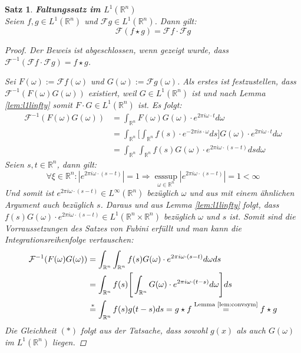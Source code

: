\documentclass{article}
\newcommand{\R}[0]{\mathbb{R}}
\newcommand{\F}[0]{\mathcal{F}}
\theoremstyle{plain}
\newtheorem{thm}{Satz}[section]
\theoremstyle{definition}
\DeclareMathOperator{\esssup}{esssup}
\begin{document}
\begin{thm}\label{thm:convinvl1}
    \textbf{Faltungssatz im $L^1(\R^n)$} \\
    Seien $f,g \in L^1(\R^n)$ und $\mathcal{F}g \in L^1(\R^n)$. Dann gilt:
    \begin{equation}
        \mathcal{F}(f \star g) = \mathcal{F}f \cdot \mathcal{F}g
    \end{equation}

    \begin{proof} \cite[S. 371f.]{howell2016principles}
        Der Beweis ist abgeschlossen, wenn gezeigt wurde, dass $\F^{-1} (\F f \cdot \F g) = f \star g$. 
        
        Sei $F(\omega) := \F f(\omega)$ und $G(\omega) := \F g(\omega)$. Als erstes ist festzustellen, dass $\F^{-1} (F(\omega) G(\omega))$ existiert, weil
        $G \in L^1(\R^n)$ ist und nach Lemma \ref{lem:l1linfty} somit $F \cdot G \in L^1(\R^n)$ ist. Es folgt: \\
        \begin{align*}
            \F^{-1} (F(\omega) G(\omega)) &= \int_{\R^n} F(\omega) G(\omega) \cdot e^{2\pi i \omega \cdot t} d\omega \\
            &= \int_{\R^n} \Bigg\lbrack \int_{\R^n} f(s) \cdot e^{-2\pi i s \cdot \omega} ds \Bigg\rbrack G(\omega) \cdot e^{2\pi i \omega \cdot t} d\omega \\
            &= \int_{\R^n} \int_{\R^n} f(s) G(\omega) \cdot e^{2\pi i \omega \cdot (s - t)} ds d\omega
        \end{align*}
        Seien $s,t \in \R^n$, dann gilt:
        \begin{equation*}
            \forall \xi \in \R^n: |e^{2\pi i \omega \cdot (s - t)}| = 1 \Rightarrow \esssup\limits_{\omega \in \R^n} |e^{2\pi i \omega \cdot (s - t)}| = 1 < \infty
        \end{equation*}
        Und somit ist $e^{2\pi i \omega \cdot (s - t)} \in L^{\infty}(\R^n)$ bezüglich $\omega$ und aus mit einem ähnlichen Argument auch bezüglich $s$.
        Daraus und aus Lemma \ref{lem:l1linfty} folgt, dass $f(s) G(\omega) \cdot e^{2\pi i \omega \cdot (s - t)} \in L^1(\R^n \times \R^n)$ bezüglich $\omega$ und $s$ ist.
        Somit sind die Vorraussetzungen des Satzes von Fubini erfüllt und man kann die Integrationsreihenfolge vertauschen:
        \begin{align*}
            \F^{-1} (F(\omega) G(\omega)) &= \int_{\R^n} \int_{\R^n} f(s) G(\omega) \cdot e^{2\pi i \omega \cdot (s - t)} d\omega ds \\
            &= \int_{\R^n} f(s) \Bigg \lbrack \int_{\R^n} G(\omega) \cdot e^{2\pi i \omega \cdot (t - s)} d\omega \Bigg \rbrack ds \\
            &\overset{*}{=} \int_{\R^n} f(s) g(t-s) ds = g \star f \overset{\text{Lemma \ref{lem:convsym}}}{=} f \star g
        \end{align*}
        Die Gleichheit $(*)$ folgt aus der Tatsache, dass sowohl $g(x)$ als auch $G(\omega)$ im $L^1(\R^n)$ liegen.
    \end{proof}
\end{thm}
\end{document}
